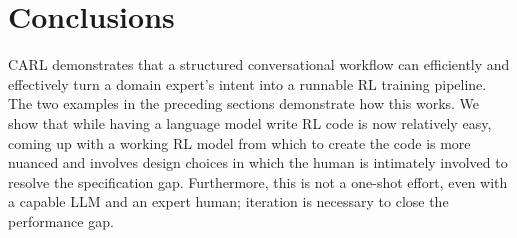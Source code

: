 \documentclass[mnsc,sglanonrev]{informs4}
\begin{document}







\section{Conclusions}
\label{sec:discussion}

CARL demonstrates that a structured conversational workflow can efficiently and effectively turn a domain expert's intent into a runnable RL training pipeline. The two examples in the preceding sections demonstrate how this works. We show that while having a language model write RL code is now relatively easy, coming up with a working RL model from which to create the code is more nuanced and involves design choices in which the human is intimately involved to resolve the specification gap. Furthermore, this is not a one-shot effort, even with a capable LLM and an expert human; iteration is necessary to close the performance gap.
\end{document}
